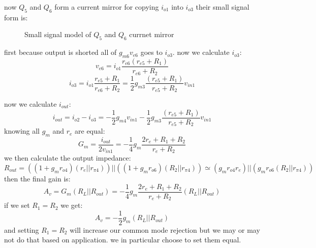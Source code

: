 \documentclass[11pt]{article}
\begin{document}
now $Q_5$ and $Q_6$ form a current mirror for copying $i_{o1}$ into $i_{o3}$ their small signal form is:
\begin{figure}[H]
    \centering
    \label{fig:smallSigMirror}
    \caption{Small signal model of $Q_5$ and $Q_6$ currnet mirror}  
\end{figure}
first because output is shorted all of $g_{m6}v_{e6}$ goes to $i_{o3}$.
now we calculate $i_{o3}$:
$$ v_{e6} = i_{o1}\frac{r_{e6}(r_{e5} + R_1)}{r_{e6} + R_2} $$
$$ i_{o3} = i_{o1}\frac{r_{e5} + R_1}{r_{e6} + R_2} = \frac{1}{2}g_{m3}\frac{(r_{e5} + R_1)}{r_{e5} + R_2}v_{in1}$$

now we calculate $i_{out}$:
$$ i_{out} = i_{o2} - i_{o3} = -\frac{1}{2}g_{m4}v_{in1} - \frac{1}{2}g_{m3}\frac{(r_{e5} + R_1)}{r_{e5} + R_2}v_{in1}$$
knowing all $g_m$ and $r_e$ are equal:
$$ G_m = \frac{i_{out}}{2v_{in1}} =  -\frac{1}{4}g_m\frac{2r_e + R_1 + R_2}{r_e + R_2} $$
we then calculate the output impedance:
$$ R_{out} = ( (1+g_m r_{o4})(r_e||r_{\pi4}) )||( (1+g_m r_{o6})(R_2||r_{\pi4}) ) \simeq (g_m r_{o4} r_e) || (g_m r_{o6}(R_2||r_{\pi4}))$$
then the final gain is:
$$ A_v = G_m(R_L||R_{out}) = -\frac{1}{4}g_m\frac{2r_e + R_1 + R_2}{r_e + R_2}(R_L||R_{out}) $$
if we set $R_1 = R_2$ we get: $$ A_v =  -\frac{1}{2}g_m(R_L||R_{out}) $$
and setting $R_1 = R_2$ will increase our common mode rejection but we may or may not do that based on application.
we in particular choose to set them equal. \\
\end{document}
